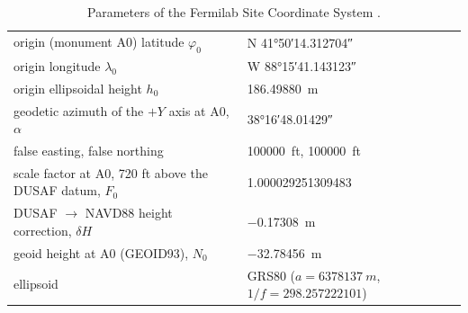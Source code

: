 \documentclass[11pt,letterpaper]{article}
\begin{document}
\begin{table}[htbp]\centering\small
\caption{Parameters of the Fermilab Site Coordinate System \cite{oshinowo1997}.}
\label{tab:fscs}
\begin{tabular}{ll}
\toprule
origin (monument A0) latitude $\varphi_0$ & N \ang{41;50;14.312704} \\
origin longitude $\lambda_0$ & W \ang{88;15;41.143123} \\
origin ellipsoidal height $h_0$ & \SI{186.49880}{m} \\
geodetic azimuth of the $+Y$ axis at A0, $\alpha$ & \ang{38;16;48.01429} \\
false easting, false northing & \SI{100000}{ft}, \SI{100000}{ft} \\
scale factor at A0, 720 ft above the DUSAF datum, $F_0$ & 1.000029251309483 \\
DUSAF $\to$ NAVD88 height correction, $\delta H$ & \SI{-0.17308}{m} \\
geoid height at A0 (GEOID93), $N_0$ & \SI{-32.78456}{m} \\
ellipsoid & GRS80 ($a=\SI{6378137}{m}$, $1/f=298.257222101$) \\
\bottomrule
\end{tabular}
\end{table}
\end{document}
